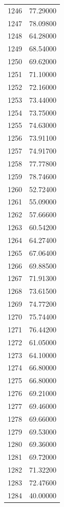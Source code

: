 \documentclass[
  letterpaper,
  DIV=11,
  numbers=noendperiod]{scrreprt}
\begin{document}
\begin{tcolorbox}
\begin{tabular}{lr}
1246 &         77.29000 \\
1247 &         78.09800 \\
1248 &         64.28000 \\
1249 &         68.54000 \\
1250 &         69.62000 \\
1251 &         71.10000 \\
1252 &         72.16000 \\
1253 &         73.44000 \\
1254 &         73.75000 \\
1255 &         74.63000 \\
1256 &         73.91100 \\
1257 &         74.91700 \\
1258 &         77.77800 \\
1259 &         78.74600 \\
1260 &         52.72400 \\
1261 &         55.09000 \\
1262 &         57.66600 \\
1263 &         60.54200 \\
1264 &         64.27400 \\
1265 &         67.06400 \\
1266 &         69.88500 \\
1267 &         71.91300 \\
1268 &         73.61500 \\
1269 &         74.77200 \\
1270 &         75.74400 \\
1271 &         76.44200 \\
1272 &         61.05000 \\
1273 &         64.10000 \\
1274 &         66.80000 \\
1275 &         66.80000 \\
1276 &         69.21000 \\
1277 &         69.46000 \\
1278 &         69.66000 \\
1279 &         69.53000 \\
1280 &         69.36000 \\
1281 &         69.72000 \\
1282 &         71.32200 \\
1283 &         72.47600 \\
1284 &         40.00000 \\

\end{tabular}
\end{tcolorbox}
\end{document}
